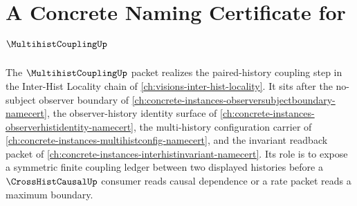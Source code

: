 \chapter{A Concrete Naming Certificate for $\MultihistCouplingUp$}
\label{ch:concrete-instances-multihistcoupling-namecert}

The $\MultihistCouplingUp$ packet realizes the paired-history coupling step in the Inter-Hist Locality chain of \autoref{ch:visions-inter-hist-locality}. It sits after the no-subject observer boundary of \autoref{ch:concrete-instances-observersubjectboundary-namecert}, the observer-history identity surface of \autoref{ch:concrete-instances-observerhistidentity-namecert}, the multi-history configuration carrier of \autoref{ch:concrete-instances-multihistconfig-namecert}, and the invariant readback packet of \autoref{ch:concrete-instances-interhistinvariant-namecert}. Its role is to expose a symmetric finite coupling ledger between two displayed histories before a $\CrossHistCausalUp$ consumer reads causal dependence or a rate packet reads a maximum boundary.

